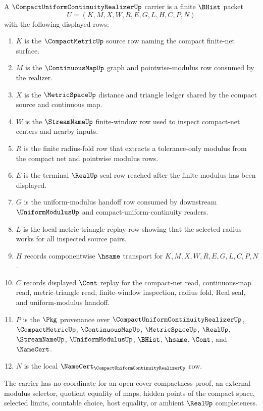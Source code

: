 \begin{definition}
\label{def:compact-uniform-continuity-realizer-carrier}
A $\CompactUniformContinuityRealizerUp$ carrier is a finite $\BHist$ packet
$$
U=(K,M,X,W,R,E,G,L,H,C,P,N)
$$
with the following displayed rows:
\begin{enumerate}
\item $K$ is the $\CompactMetricUp$ source row naming the compact finite-net surface.
\item $M$ is the $\ContinuousMapUp$ graph and pointwise-modulus row consumed by the realizer.
\item $X$ is the $\MetricSpaceUp$ distance and triangle ledger shared by the compact source and continuous map.
\item $W$ is the $\StreamNameUp$ finite-window row used to inspect compact-net centers and nearby inputs.
\item $R$ is the finite radius-fold row that extracts a tolerance-only modulus from the compact net and pointwise modulus rows.
\item $E$ is the terminal $\RealUp$ seal row reached after the finite modulus has been displayed.
\item $G$ is the uniform-modulus handoff row consumed by downstream $\UniformModulusUp$ and compact-uniform-continuity readers.
\item $L$ is the local metric-triangle replay row showing that the selected radius works for all inspected source pairs.
\item $H$ records componentwise $\hsame$ transport for $K,M,X,W,R,E,G,L,C,P,N$.
\item $C$ records displayed $\Cont$ replay for the compact-net read, continuous-map read, metric-triangle read, finite-window inspection, radius fold, Real seal, and uniform-modulus handoff.
\item $P$ is the $\Pkg$ provenance over $\CompactUniformContinuityRealizerUp$, $\CompactMetricUp$, $\ContinuousMapUp$, $\MetricSpaceUp$, $\RealUp$, $\StreamNameUp$, $\UniformModulusUp$, $\BHist$, $\hsame$, $\Cont$, and $\NameCert$.
\item $N$ is the local $\NameCert_{\CompactUniformContinuityRealizerUp}$ row.
\end{enumerate}
The carrier has no coordinate for an open-cover compactness proof, an external modulus selector, quotient equality of maps, hidden points of the compact space, selected limits, countable choice, host equality, or ambient $\RealUp$ completeness.
\end{definition}

